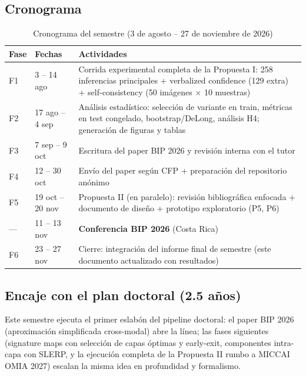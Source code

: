 \documentclass[12pt,a4paper]{article}
\begin{document}
\subsection{Cronograma}

\begin{table}[H]
\centering
\caption{Cronograma del semestre (3 de agosto -- 27 de noviembre de 2026)}
\label{tab:cronograma}
\begin{tabularx}{\textwidth}{llX}
\toprule
\textbf{Fase} & \textbf{Fechas} & \textbf{Actividades} \\
\midrule
F1 & 3 -- 14 ago & Corrida experimental completa de la Propuesta I: 258 inferencias principales + verbalized confidence (129 extra) + self-consistency (50 imágenes $\times$ 10 muestras) \\
F2 & 17 ago -- 4 sep & Análisis estadístico: selección de variante en train, métricas en test congelado, bootstrap/DeLong, análisis H4; generación de figuras y tablas \\
F3 & 7 sep -- 9 oct & Escritura del paper BIP 2026 y revisión interna con el tutor \\
F4 & 12 -- 30 oct & Envío del paper según CFP + preparación del repositorio anónimo \\
F5 & 19 oct -- 20 nov & Propuesta II (en paralelo): revisión bibliográfica enfocada + documento de diseño + prototipo exploratorio (P5, P6) \\
--- & 11 -- 13 nov & \textbf{Conferencia BIP 2026} (Costa Rica) \\
F6 & 23 -- 27 nov & Cierre: integración del informe final de semestre (este documento actualizado con resultados) \\
\bottomrule
\end{tabularx}
\end{table}

\subsection{Encaje con el plan doctoral (2.5 años)}

Este semestre ejecuta el primer eslabón del pipeline doctoral: el paper BIP 2026 (aproximación simplificada cross-modal) abre la línea; las fases siguientes (signature maps con selección de capas óptimas y early-exit, componentes intra-capa con SLERP, y la ejecución completa de la Propuesta II rumbo a MICCAI OMIA 2027) escalan la misma idea en profundidad y formalismo.

\end{document}
